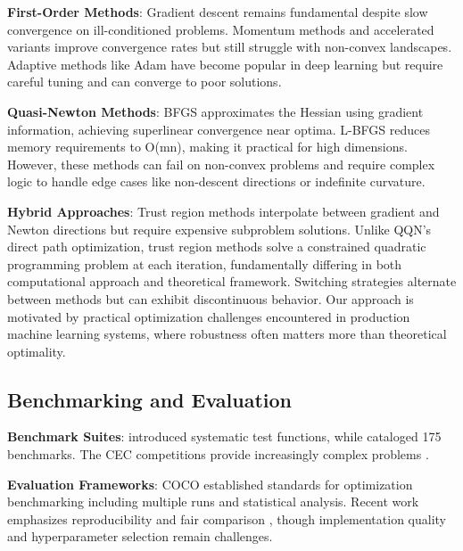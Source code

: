 \textbf{First-Order Methods}: Gradient descent \citep{cauchy1847methode} remains fundamental despite slow convergence on ill-conditioned problems.
Momentum methods \citep{polyak1964some} and accelerated variants \citep{nesterov1983method} improve convergence rates but still struggle with non-convex landscapes.
Adaptive methods like Adam \citep{kingma2015adam} have become popular in deep learning but require careful tuning and can converge to poor solutions.

\textbf{Quasi-Newton Methods}: BFGS \citep{broyden1970convergence, fletcher1970new, goldfarb1970family, shanno1970conditioning} approximates the Hessian using gradient information, achieving superlinear convergence near optima.
L-BFGS \citep{liu1989limited} reduces memory requirements to O(mn), making it practical for high dimensions.
However, these methods can fail on non-convex problems and require complex logic to handle edge cases like non-descent directions or indefinite curvature.

\textbf{Hybrid Approaches}: Trust region methods \citep{more1983computing} interpolate between gradient and Newton directions but require expensive subproblem solutions.
Unlike QQN's direct path optimization, trust region methods solve a constrained quadratic programming problem at each iteration, fundamentally differing in both computational approach and theoretical framework.
Switching strategies \citep{morales2000automatic} alternate between methods but can exhibit discontinuous behavior.
Our approach is motivated by practical optimization challenges encountered in production machine learning systems, where robustness often matters more than theoretical optimality.

\hypertarget{benchmarking-and-evaluation}{%
\subsection{Benchmarking and Evaluation}\label{benchmarking-and-evaluation}}

\textbf{Benchmark Suites}: \citet{dejong1975analysis} introduced systematic test functions, while \citet{jamil2013literature} cataloged 175 benchmarks.
The CEC competitions provide increasingly complex problems \citep{liang2013problem}.

\textbf{Evaluation Frameworks}: COCO \citep{hansen2016coco} established standards for optimization benchmarking including multiple runs and statistical analysis.
Recent work emphasizes reproducibility \citep{beiranvand2017best} and fair comparison \citep{schmidt2021descending}, though implementation quality and hyperparameter selection remain challenges.

